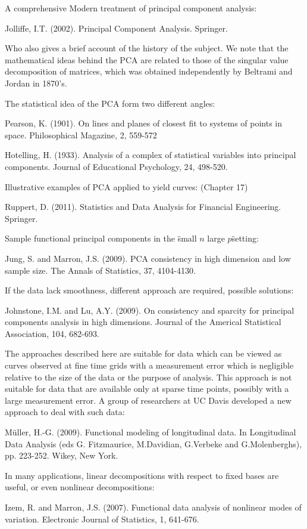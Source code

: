 A comprehensive Modern treatment of principal component analysis:

Jolliffe, I.T. (2002). Principal Component Analysis. Springer.

Who also gives a brief account of the history of the subject. We note that the mathematical ideas behind the PCA are related to those of the singular value decomposition of matrices, which was obtained independently by Beltrami and Jordan in 1870's.

The statistical idea of the PCA form two different angles:

Pearson, K. (1901). On lines and planes of closest fit to systems of points in space. Philosophical Magazine, 2, 559-572

Hotelling, H. (1933). Analysis of a complex of statistical variables into principal components. Journal of Educational Psychology, 24, 498-520.

Illustrative examples of PCA applied to yield curves: (Chapter 17)

Ruppert, D. (2011). Statistics and Data Analysis for Financial Engineering. Springer.

Sample functional principal components in the \"small $n$ large $p$\" setting:

Jung, S. and Marron, J.S. (2009). PCA consistency in high dimension and low sample size. The Annals of Statistics, 37, 4104-4130.

If the data lack smoothness, different approach are required, possible solutions:

Johnstone, I.M. and Lu, A.Y. (2009). On consistency and sparcity for principal components analysis in high dimensions. Journal of the Americal Statistical Association, 104, 682-693.

The approaches described here are suitable for data which can be viewed as curves observed at fine time grids with a measurement error which is negligible relative to the size of the data or the purpose of analysis. This approach is not suitable for data that are available only at sparse time points, possibly with a large measurement error. A group of researchers at UC Davis developed a new approach to deal with such data:

M\"{u}ller, H.-G. (2009). Functional modeling of longitudinal data. In Longitudinal Data Analysis (eds G. Fitzmaurice, M.Davidian, G.Verbeke and G.Molenberghs), pp. 223-252. Wikey, New York.

In many applications, linear decompositions with respect to fixed bases are useful, or even nonlinear decompositions:

Izem, R. and Marron, J.S. (2007). Functional data analysis of nonlinear modes of variation. Electronic Journal of Statistics, 1, 641-676.

